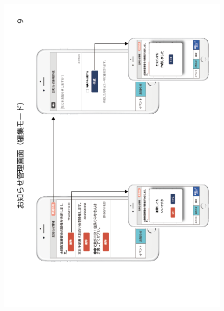 \begin{figure}[ht]
    \begin{center}
      \includegraphics[keepaspectratio, scale=0.7]{appendixs/appendixB_figres/fig9.png}
    \end{center}
\end{figure}
